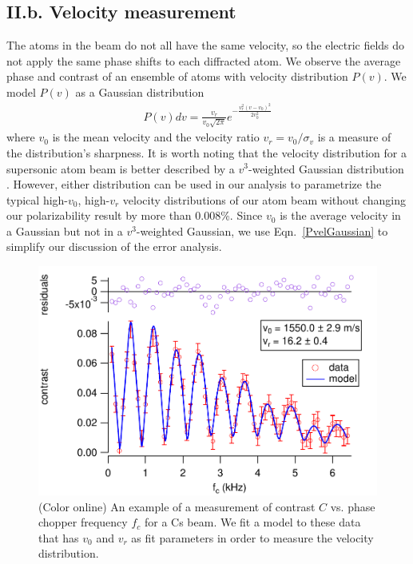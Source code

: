 \documentclass[twocolumn,pra,showpacs,superscriptaddress,longbibliography]{revtex4-1}   %
\newcommand{\eqnref}[1]{Eqn.~\eqref{#1}}
\begin{document}
\subsection{II.b. Velocity measurement}

The atoms in the beam do not all have the same velocity, so the electric fields do not apply the same phase shifts to each diffracted atom.
We observe the average phase and contrast of an ensemble of atoms with velocity distribution $P(v)$. 
We model $P(v)$ as a Gaussian distribution
\begin{align}
	P(v)dv = \frac{v_r}{v_0\sqrt{2\pi}}e^{-\frac{v_r^2(v-v_0)^2}{2v_0^2}}
	\label{PvelGaussian}
\end{align}
where $v_0$ is the mean velocity and the velocity ratio $v_r = v_0/\sigma_v$ is a measure of the distribution's sharpness. It is worth noting that the velocity distribution for a supersonic atom beam is better described by a $v^3$-weighted Gaussian distribution
\cite{Berman1997}. However, either distribution can be used in our analysis to parametrize the typical high-$v_0$, high-$v_r$ velocity distributions of our atom beam without changing our polarizability result by more than 0.008\%. Since $v_0$ is the average velocity in a Gaussian but not in a $v^3$-weighted Gaussian, we use \eqnref{PvelGaussian} to simplify our discussion of the error analysis. 


\begin{figure}
\includegraphics[width=\linewidth,keepaspectratio]{CvCF_150420_ca.pdf}
\caption{\label{CvCFExample}(Color online) An example of a measurement of contrast $C$ vs. phase chopper frequency $f_c$ for a Cs beam. We fit a model to these data that has $v_0$ and $v_r$ as fit parameters in order to measure the velocity distribution.}
\end{figure}
\end{document}
